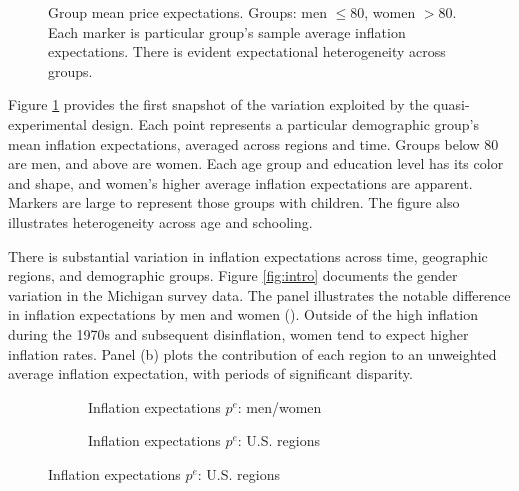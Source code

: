 \documentclass[12pt]{article}
\begin{document}
\begin{figure}
\centering
\caption{Group mean price expectations. Groups: men $\leq 80$, women $>80$. Each marker is particular group's sample average inflation expectations.  There is evident expectational heterogeneity across groups.}\label{fig:GroupMeans}

\end{figure}

Figure \ref{fig:GroupMeans} provides the first snapshot of the variation exploited by the quasi-experimental design. Each point represents a particular demographic group's mean inflation expectations, averaged across regions and time. Groups below 80 are men, and above are women. Each age group and education level has its color and shape, and women's higher average inflation expectations are apparent. Markers are large to represent those groups with children. The figure also illustrates heterogeneity across age and schooling.

There is substantial variation in inflation expectations across time, geographic regions, and demographic groups. Figure \ref{fig:intro} documents the gender variation in the Michigan survey data. The panel illustrates the notable difference in inflation expectations by men and women (\cite{BryanVenkatu}). Outside of the high inflation during the 1970s and subsequent disinflation, women tend to expect higher inflation rates. Panel (b) plots the contribution of each region to an unweighted average inflation expectation, with periods of significant disparity.  



\begin{figure}
\centering
\caption{Diversity of inflation survey expectations: gender \& regions. }\label{fig:intro}
\begin{subfigure}[t]{ 0.75\textwidth}
\centering

\caption{Inflation expectations $p^e$: men/women}
\end{subfigure}
\vfill
\begin{subfigure}[t]{0.75\textwidth}
\centering

\caption{Inflation expectations $p^e$: U.S. regions}\label{fig:intro:RegInf}
\end{subfigure}
\end{figure}
\end{document}
